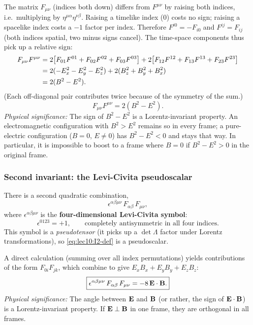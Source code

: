 The matrix $F_{\mu\nu}$ (indices both down) differs from $F^{\mu\nu}$ by raising both indices, i.e.\
multiplying by $\eta^{\mu\alpha}\eta^{\nu\beta}$.  Raising a timelike index (0) costs no sign;
raising a spacelike index costs a $-1$ factor per index.  Therefore $F^{i0}=-F_{i0}$ and
$F^{ij}=F_{ij}$ (both indices spatial, two minus signs cancel).  The time-space components thus pick
up a relative sign:
\begin{align}
  F_{\mu\nu}F^{\mu\nu}
  &=
  2\!\left[F_{01}F^{01}+F_{02}F^{02}+F_{03}F^{03}\right]
  +
  2\!\left[F_{12}F^{12}+F_{13}F^{13}+F_{23}F^{23}\right]
  \notag\\
  &=
  2(-E_x^2-E_y^2-E_z^2)
  +
  2(B_z^2+B_y^2+B_x^2)
  \notag\\
  &=
  2(B^2-E^2).
  \label{eq:lec10:I1-calc}
\end{align}
(Each off-diagonal pair contributes twice because of the symmetry of the sum.)
\begin{equation}\label{eq:lec10:I1}
  \boxed{
  F_{\mu\nu}F^{\mu\nu}
  =
  2\!\left(B^2 - E^2\right).
  }
\end{equation}
\textit{Physical significance:} The sign of $B^2-E^2$ is a Lorentz-invariant property.  An
electromagnetic configuration with $B^2>E^2$ remains so in every frame; a pure-electric configuration
($B=0$, $E\neq 0$) has $B^2-E^2<0$ and stays that way.  In particular, it is impossible to boost to
a frame where $B=0$ if $B^2-E^2>0$ in the original frame.

\subsubsection*{Second invariant: the Levi-Civita pseudoscalar}

There is a second quadratic combination,
\begin{equation}\label{eq:lec10:I2-def}
  \epsilon^{\alpha\beta\mu\nu}\,F_{\alpha\beta}\,F_{\mu\nu},
\end{equation}
where $\epsilon^{\alpha\beta\mu\nu}$ is the \textbf{four-dimensional Levi-Civita symbol}:
\begin{equation}\label{eq:lec10:eps-def}
  \epsilon^{0123}=+1, \qquad
  \text{completely antisymmetric in all four indices.}
\end{equation}
This symbol is a \emph{pseudotensor} (it picks up a $\det\Lambda$ factor under Lorentz
transformations), so \eqref{eq:lec10:I2-def} is a pseudoscalar.

A direct calculation (summing over all index permutations) yields contributions of the form
$F_{0i}F_{jk}$, which combine to give $E_x B_x + E_y B_y + E_z B_z$:
\begin{equation}\label{eq:lec10:I2}
  \boxed{
  \epsilon^{\alpha\beta\mu\nu}\,F_{\alpha\beta}\,F_{\mu\nu}
  =
  -8\,\mathbf{E}\cdot\mathbf{B} .
  }
\end{equation}
\textit{Physical significance:} The angle between $\mathbf{E}$ and $\mathbf{B}$ (or rather, the sign of
$\mathbf{E}\cdot\mathbf{B}$) is a Lorentz-invariant property.  If $\mathbf{E}\perp\mathbf{B}$ in one frame, they are orthogonal
in all frames.

